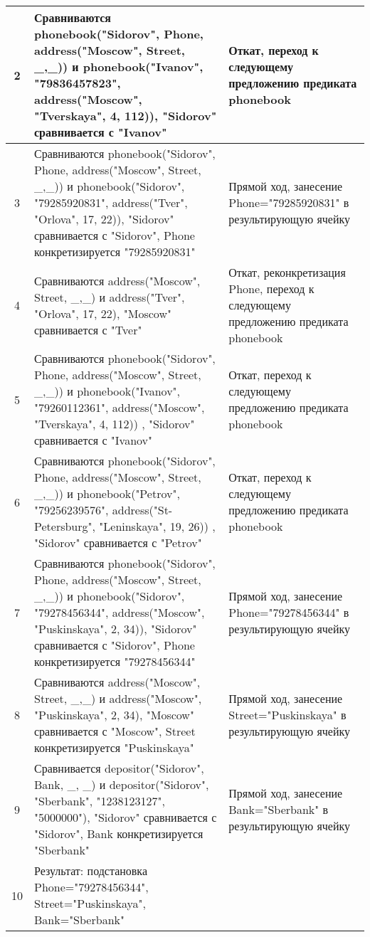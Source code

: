 \documentclass[a4paper,12pt]{article}
\begin{document}
\begin{table}[ht!] 
\begin{tabularx}{\linewidth}{|c|>{\centering}X|>{\centering}X|}
\hline
		2 & Сравниваются phonebook("Sidorov"{}, Phone, address("Moscow"{}, Street, \_,\_)) и phonebook("Ivanov"{}, "79836457823"{}, address("Moscow"{}, "Tverskaya"{}, 4, 112)), "Sidorov" сравнивается с "Ivanov" & Откат, переход к следующему предложению предиката phonebook \tabularnewline
		\hline
		3 & Сравниваются phonebook("Sidorov"{}, Phone, address("Moscow"{}, Street, \_,\_)) и phonebook("Sidorov"{}, "79285920831"{}, address("Tver"{}, "Orlova"{}, 17, 22)), "Sidorov" сравнивается с "Sidorov"{}, Phone конкретизируется  "79285920831" & Прямой ход, занесение Phone="79285920831" в результирующую ячейку \tabularnewline
		\hline
		4  & Сравниваются address("Moscow"{}, Street, \_,\_)  и address("Tver"{}, "Orlova"{}, 17, 22), "Moscow" сравнивается с "Tver" & Откат, реконкретизация Phone, переход к следующему предложению предиката phonebook \tabularnewline
		\hline
		5 & Сравниваются phonebook("Sidorov"{}, Phone, address("Moscow"{}, Street, \_,\_)) и phonebook("Ivanov"{}, "79260112361"{}, address("Moscow"{}, "Tverskaya"{}, 4, 112)) , "Sidorov" сравнивается с "Ivanov" & Откат, переход к следующему предложению предиката phonebook \tabularnewline
		\hline
		6 & Сравниваются phonebook("Sidorov"{}, Phone, address("Moscow"{}, Street, \_,\_)) и phonebook("Petrov"{}, "79256239576"{}, address("St-Petersburg"{}, "Leninskaya"{}, 19, 26)) , "Sidorov" сравнивается с "Petrov" & Откат, переход к следующему предложению предиката phonebook \tabularnewline
		\hline
		7 & Сравниваются phonebook("Sidorov"{}, Phone, address("Moscow"{}, Street, \_,\_)) и phonebook("Sidorov"{}, "79278456344"{}, address("Moscow"{}, "Puskinskaya"{}, 2, 34)), "Sidorov" сравнивается с "Sidorov"{}, Phone конкретизируется "79278456344" & Прямой ход, занесение Phone="79278456344" в результирующую ячейку \tabularnewline
		\hline
		8  & Сравниваются address("Moscow"{}, Street, \_,\_)  и address("Moscow"{}, "Puskinskaya"{}, 2, 34), "Moscow" сравнивается с "Moscow"{}, Street конкретизируется "Puskinskaya"  & Прямой ход, занесение  Street="Puskinskaya" в результирующую ячейку \tabularnewline
		\hline
		9 & Сравнивается depositor("Sidorov"{}, Bank, \_, \_) и depositor("Sidorov"{}, "Sberbank"{}, "1238123127"{}, "5000000"), "Sidorov" сравнивается с "Sidorov"{}, Bank конкретизируется "Sberbank" & Прямой ход, занесение Bank="Sberbank" в результирующую ячейку\tabularnewline
		\hline
		10 & Результат: подстановка Phone="79278456344"{}, Street="Puskinskaya"{}, Bank="Sberbank" & \tabularnewline
		\hline
	\end{tabularx}
\end{table}	
\end{document}
